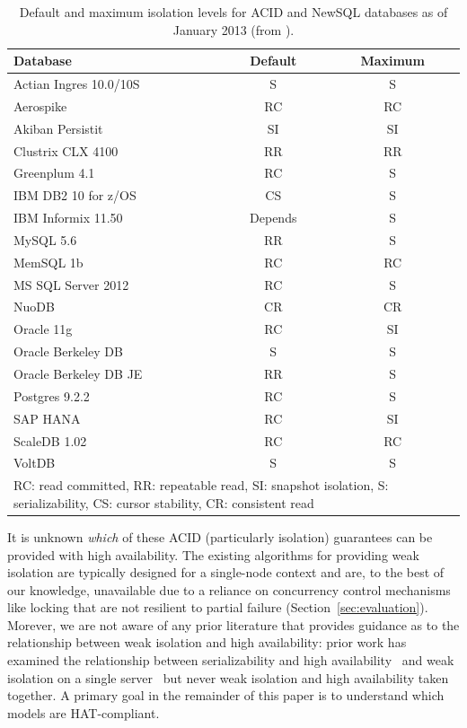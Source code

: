 \begin{table}
\begin{center}
\begin{small}
\begin{tabular}{|l|c|c|}
\hline
Database & Default & Maximum\\\hline
Actian Ingres 10.0/10S & S & S\\
Aerospike & RC & RC\\
Akiban Persistit & SI & SI\\
Clustrix CLX 4100 & RR & RR\\
Greenplum 4.1 & RC & S \\
IBM DB2 10 for z/OS & CS & S\\
IBM Informix 11.50 & Depends & S\\
MySQL 5.6 & RR & S \\
MemSQL 1b & RC & RC\\
MS SQL Server 2012 & RC & S \\
NuoDB & CR & CR\\
Oracle 11g & RC & SI\\
Oracle Berkeley DB & S & S\\
Oracle Berkeley DB JE & RR & S\\
Postgres 9.2.2 & RC & S\\
SAP HANA & RC & SI\\
ScaleDB 1.02 & RC & RC\\
VoltDB & S & S\\
\hline
\multicolumn{3}{|p{7cm}|}{{\footnotesize RC: read committed, RR: repeatable read, SI: snapshot isolation, S: serializability, CS: cursor stability, CR: consistent read}}\\\hline

\end{tabular}
\caption{Default and maximum isolation levels for ACID and NewSQL
  databases as of January 2013 (from
  \protect\cite{hat-hotos}).}\vspace{-1.5em}
\label{table:existing}
\end{small}
\end{center}
\end{table}

It is unknown \textit{which} of these ACID (particularly isolation)
guarantees can be provided with high availability. The existing
algorithms for providing weak isolation are typically designed for a
single-node context and are, to the best of our knowledge, unavailable
due to a reliance on concurrency control mechanisms like locking that
are not resilient to partial failure
(Section~\ref{sec:evaluation}). Morever, we are not aware of any prior
literature that provides guidance as to the relationship between weak
isolation and high availability: prior work has examined the
relationship between serializability and high
availability~\cite{davidson-survey} and weak isolation on a single
server~\cite{adya, ansicritique, gray-isolation} but never weak
isolation and high availability taken together.  A primary goal in the
remainder of this paper is to understand which models are
HAT-compliant.

